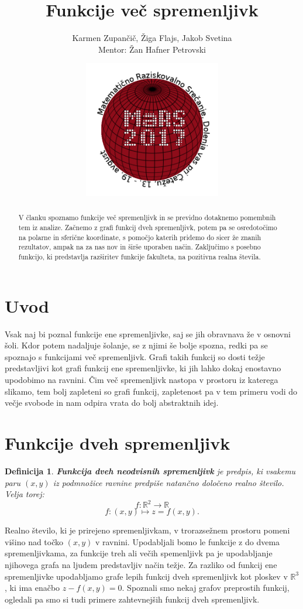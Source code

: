 \documentclass[12pt, a4paper]{article}
\title{Funkcije več spremenljivk}
\author{Karmen Zupančič, Žiga Flajs, Jakob Svetina \\ Mentor: Žan Hafner Petrovski}
\date{\includegraphics[width = 6cm]{logo_MaRS2017.png}}
\newtheorem{definicija}{Definicija}
\begin{document}
\maketitle

\begin{abstract}
\noindent
V članku spoznamo funkcije več spremenljivk in se previdno dotaknemo pomembnih tem iz analize. Začnemo z grafi funkcij dveh spremenljivk, potem pa se osredotočimo na polarne in sferične koordinate, s pomočjo katerih pridemo do sicer že znanih rezultatov, ampak na za nas nov in širše uporaben način. Zaključimo s posebno funkcijo, ki predstavlja razširitev funkcije fakulteta, na pozitivna realna števila.
\end{abstract}

\section{Uvod}
Vsak naj bi poznal funkcije ene spremenljivke, saj se jih obravnava že v osnovni šoli. Kdor potem nadaljuje šolanje, se z njimi še bolje spozna, redki pa se spoznajo s funkcijami več spremenljivk. Grafi takih funkcij so dosti težje predstavljivi kot grafi funkcij ene spremenljivke, ki jih lahko dokaj enostavno upodobimo na ravnini. Čim več spremenljivk nastopa v prostoru iz katerega slikamo, tem bolj zapleteni so grafi funkcij, zapletenost pa v tem primeru vodi do večje svobode in nam odpira vrata do bolj abstraktnih idej.

\section{Funkcije dveh spremenljivk}

\begin{definicija}
\textbf{Funkcija dveh neodvisnih spremenljivk} je predpis, ki vsakemu paru $(x,y)$ iz podmnožice ravnine predpiše natančno določeno realno število.
Velja torej: 
$$f : \mathbb{R}^2 \rightarrow \mathbb{R}$$
$$f:(x,y) \mapsto z=f(x,y).$$

\end{definicija}

Realno število, ki je prirejeno spremenljivkam, v trorazsežnem prostoru pomeni višino nad točko $(x,y)$ v ravnini. Upodabljali bomo le funkcije z do dvema spremenljivkama, za funkcije treh ali večih spemenljivk pa je upodabljanje njihovega grafa na ljudem predstavljiv način težje. Za razliko od funkcij ene spremenljivke upodabljamo grafe lepih funkcij dveh spremenljivk kot ploskev v $\mathbb{R}^3$, ki ima enačbo $z-f(x,y)=0$. Spoznali smo nekaj grafov preprostih funkcij, ogledali pa smo si tudi primere zahtevnejših funkcij dveh spremenljivk.
\end{document}
